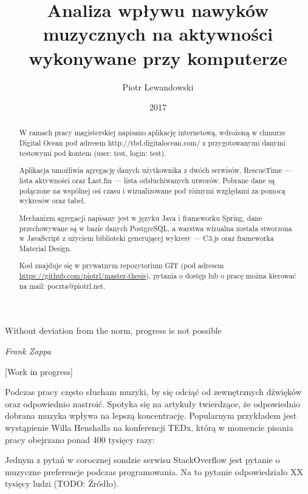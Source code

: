 \documentclass[brudnopis]{xmgr}
\author   {Piotr Lewandowski}
\title    {Analiza wpływu nawyków muzycznych na aktywności wykonywane przy komputerze}
\date     {2017}
\begin{document}
\begin{abstract}
    W ramach pracy magisterskiej napisano aplikację internetową,
    wdrożoną w chmurze Digital Ocean pod adresem http://tbd.digitalocean.com/
    z przygotowanymi danymi testowymi pod kontem (user: test, login: test).

    Aplikacja umożliwia agregację danych użytkownika z dwóch serwisów,
    RescueTime — lista aktywności oraz
    Last.fm — lista odsłuchiwanych utworów.
    Pobrane dane są połączone na wspólnej osi czasu i wizualizowane pod różnymi względami za pomocą wykresów oraz tabel.

    Mechanizm agregacji napisany jest w języku Java i frameworku Spring,
    dane przechowywane są w bazie danych PostgreSQL,
    a warstwa wizualna została stworzona w JavaScript
    z użyciem biblioteki generującej wykresy — C3.js
    oraz frameworka Material Design.

    Kod znajduje się w prywatnym repozytorium GIT (pod adresem \url{https://github.com/piotrl/master-thesis}),
    pytania o dostęp lub o pracę można kierować na mail: poczta@piotrl.net.
\end{abstract}


\maketitle

\introduction

\epigraph{Without deviation from the norm, progress is not possible}{\textit{Frank Zappa}}

[Work in progress]

Podczas pracy często słucham muzyki, by się odciąć od zewnętrznych dźwięków oraz odpowiednio nastroić.
Spotyka się na artykuły twierdzące, że odpowiednio dobrana muzyka wpływa na lepszą koncentrację.
Popularnym przykładem jest wystąpienie Willa Henshalla na konferencji TEDx,
którą w momencie pisania pracy obejrzano ponad 400 tysięcy razy:

Jednym z pytań w corocznej sondzie serwisu StackOverflow jest pytanie o muzyczne preferencje podczas programowania.
Na to pytanie odpowiedziało XX tysięcy ludzi (TODO: Źródło).
\end{document}
